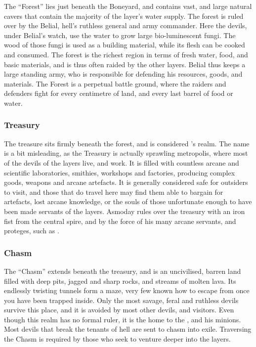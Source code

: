 The ``Forest'' lies just beneath the Boneyard, and contains vast, and large
natural cavers that contain the majority of the layer's water supply. The
forest is ruled over by the Belial, hell's ruthless general and army
commander. Here the devils, under Belial's watch, use the water to grow large
bio-luminescent fungi. The wood of those fungi is used as a building material,
while its flesh can be cooked and consumed. The forest is the richest region
in terms of fresh water, food, and basic materials, and is thus often raided
by the other layers. Belial thus keeps a large standing army, who is responsible
for defending his resources, goods, and materials. The Forest is a perpetual
battle ground, where the raiders and defenders fight for every centimetre of
land, and every last barrel of food or water.

\subsubsection{Treasury}
\label{sec:Treasury}

The treasure sits firmly beneath the forest, and is considered
's realm. The name is a bit misleading, as the Treasury
is actually sprawling metropolis, where most of the devils of the layers live,
and work. It is filled with countless arcane and scientific laboratories,
smithies, workshops and factories, producing complex goods, weapons and arcane
artefacts. It is generally considered safe for outsiders to visit, and those
that do travel here may find them able to bargain for artefacts, lost arcane
knowledge, or the souls of those unfortunate enough to have been made servants
of the layers. Asmoday rules over the treasury with an iron fist from the
central spire, and by the force of his many arcane servants, and proteges,
such as .

\subsubsection{Chasm}
\label{sec:Chasm}

The ``Chasm'' extends beneath the treasury, and is an uncivilised, barren land
filled with deep pits, jagged and sharp rocks, and streams of molten lava. Its
endlessly twisting tunnels form a maze, very few known how to escape from once
you have been trapped inside. Only the most savage, feral and ruthless devils
survive this place, and it is avoided by most other devils, and visitors. Even
though this realm has no formal ruler, it is the home to the
, and his minions. Most devils that break the tenants
of hell are sent to chasm into exile. Traversing the Chasm is required by
those who seek to venture deeper into the layers.

